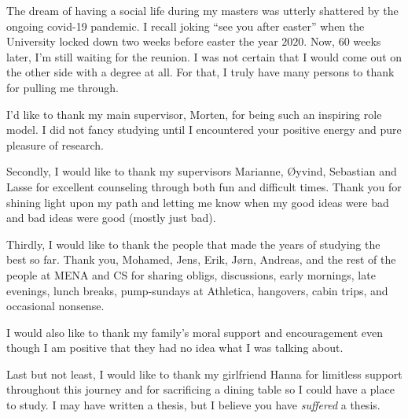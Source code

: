 
The dream of having a social life during my masters was utterly shattered by the ongoing covid-19 pandemic. I recall joking ``see you after easter'' when the University locked down two weeks before easter the year $2020$. Now, $60$ weeks later, I'm still waiting for the reunion.
I was not certain that I would come out on the other side with a degree at all. For that, I truly have many persons to thank for pulling me through.

I'd like to thank my main supervisor, Morten, for being such an inspiring role model. I did not fancy studying until I encountered your positive energy and pure pleasure of research.


Secondly, I would like to thank my supervisors Marianne, Øyvind, Sebastian and Lasse for excellent counseling through both fun and difficult times. Thank you for shining light upon my path and letting me know when my good ideas were bad and bad ideas were good (mostly just bad).


Thirdly, I would like to thank the people that made the years of studying the best so far. Thank you, Mohamed, Jens, Erik, Jørn, Andreas, and the rest of the people at MENA and CS for sharing obligs, discussions, early mornings, late evenings, lunch breaks, pump-sundays at Athletica, hangovers, cabin trips, and occasional nonsense.

I would also like to thank my family's moral support and encouragement even though I am positive that they had no idea what I was talking about.



Last but not least, I would like to thank my girlfriend Hanna for limitless support throughout this journey and for sacrificing a dining table so I could have a place to study. I may have written a thesis, but I believe you have \emph{suffered} a thesis.
